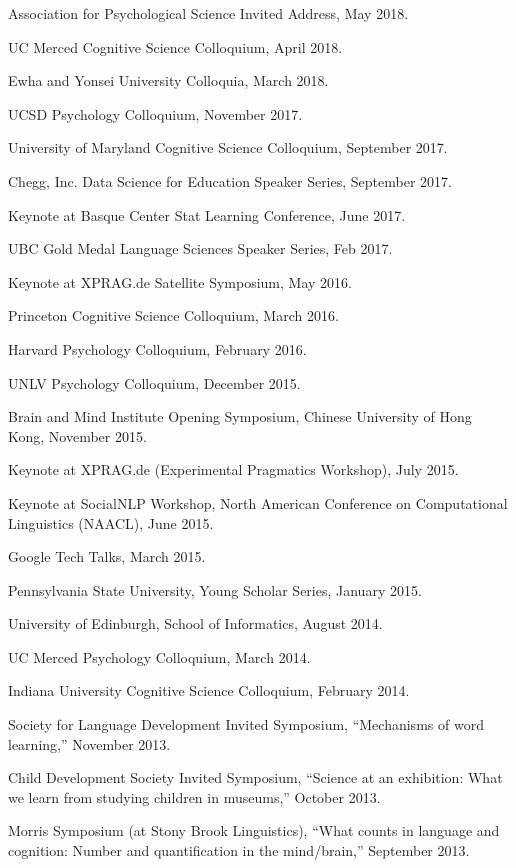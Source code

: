 \documentclass{article}
\renewenvironment{itemize}{
\begin{list}{}{
  \setlength{\leftmargin}{1.5em}
  }
  }{
\end{list}
}
\begin{document}
\begin{itemize}
  \item Association for Psychological Science Invited Address, May 2018.
  \item UC Merced Cognitive Science Colloquium, April 2018.
  \item Ewha and Yonsei University Colloquia, March 2018.
  \item UCSD Psychology Colloquium, November 2017.
  \item University of Maryland Cognitive Science Colloquium, September 2017.
  \item Chegg, Inc. Data Science for Education Speaker Series, September 2017.
  \item Keynote at Basque Center Stat Learning Conference, June 2017.
  \item UBC Gold Medal Language Sciences Speaker Series, Feb 2017.
  \item Keynote at XPRAG.de Satellite Symposium, May 2016.
  \item Princeton Cognitive Science Colloquium, March 2016.
  \item Harvard Psychology Colloquium, February 2016.
  \item UNLV Psychology Colloquium, December 2015.
  \item Brain and Mind Institute Opening Symposium, Chinese University of Hong Kong, November 2015.
  \item Keynote at XPRAG.de (Experimental Pragmatics Workshop), July 2015.
  \item Keynote at SocialNLP Workshop, North American Conference on Computational Linguistics (NAACL), June 2015.
  \item Google Tech Talks, March 2015.
  \item Pennsylvania State University, Young Scholar Series, January 2015.
  \item University of Edinburgh, School of Informatics, August 2014.
  \item UC Merced Psychology Colloquium, March 2014.
  \item Indiana University Cognitive Science Colloquium, February 2014.
  \item Society for Language Development Invited Symposium, ``Mechanisms of word learning,'' November 2013.
  \item Child Development Society Invited Symposium, ``Science at an exhibition: What we learn from studying children in museums,'' October 2013.
  \item Morris Symposium (at Stony Brook Linguistics), ``What counts in language and cognition: Number and quantification in the mind/brain,'' September 2013.

\end{itemize}
\end{document}

